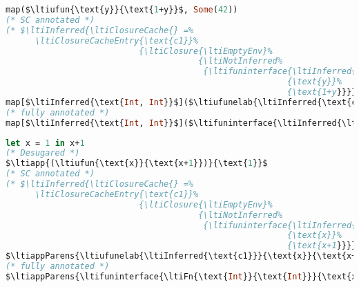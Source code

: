 {
\singlespacing
\begin{lstlisting}[language=ml,mathescape=true]
map($\ltiufun{\text{y}}{\text{1+y}}$, Some(42))
(* SC annotated *)
(* $\ltiInferred{\ltiClosureCache{} =%
      \ltiClosureCacheEntry{\text{c1}}%
                           {\ltiClosure{\ltiEmptyEnv}%
                                       {\ltiNotInferred%
                                        {\ltifuninterface{\ltiInferred{\ltiFn{\text{Int}}{\text{Int}}}}%
                                                         {\text{y}}%
                                                         {\text{1+y}}}}}}$ *)
map[$\ltiInferred{\text{Int, Int}}$]($\ltiufunelab{\ltiInferred{\text{c1}}}{\text{y}}{\text{1+y}}$, Some[$\ltiInferred{\text{Int}}$](42))
(* fully annotated *)
map[$\ltiInferred{\text{Int, Int}}$]($\ltifuninterface{\ltiInferred{\ltiFn{\text{Int}}{\text{Int}}}}{\text{y}}{\text{1+y}}$, Some[$\ltiInferred{\text{Int}}$](42))
\end{lstlisting}
}

{
\singlespacing
\begin{lstlisting}[language=ml,mathescape=true]
let x = 1 in x+1
(* Desugared *)
$\ltiapp{(\ltiufun{\text{x}}{\text{x+1}})}{\text{1}}$
(* SC annotated *)
(* $\ltiInferred{\ltiClosureCache{} =%
      \ltiClosureCacheEntry{\text{c1}}%
                           {\ltiClosure{\ltiEmptyEnv}%
                                       {\ltiNotInferred%
                                        {\ltifuninterface{\ltiInferred{\ltiFn{\text{Int}}{\text{Int}}}}%
                                                         {\text{x}}%
                                                         {\text{x+1}}}}}}$ *)
$\ltiappParens{\ltiufunelab{\ltiInferred{\text{c1}}}{\text{x}}{\text{x+1}}}{\text{1}}$
(* fully annotated *)
$\ltiappParens{\ltifuninterface{\ltiFn{\text{Int}}{\text{Int}}}{\text{x}}{\text{x+1}}}{\text{1}}$
\end{lstlisting}
}



